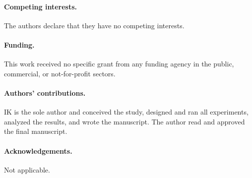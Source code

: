 \documentclass[11pt, a4paper]{article}
\begin{document}
\paragraph{Competing interests.}
The authors declare that they have no competing interests.

\paragraph{Funding.}
This work received no specific grant from any funding agency in the
public, commercial, or not-for-profit sectors.

\paragraph{Authors' contributions.}
IK is the sole author and conceived the study, designed and ran all
experiments, analyzed the results, and wrote the manuscript. The author
read and approved the final manuscript.

\paragraph{Acknowledgements.}
Not applicable.


\end{document}
